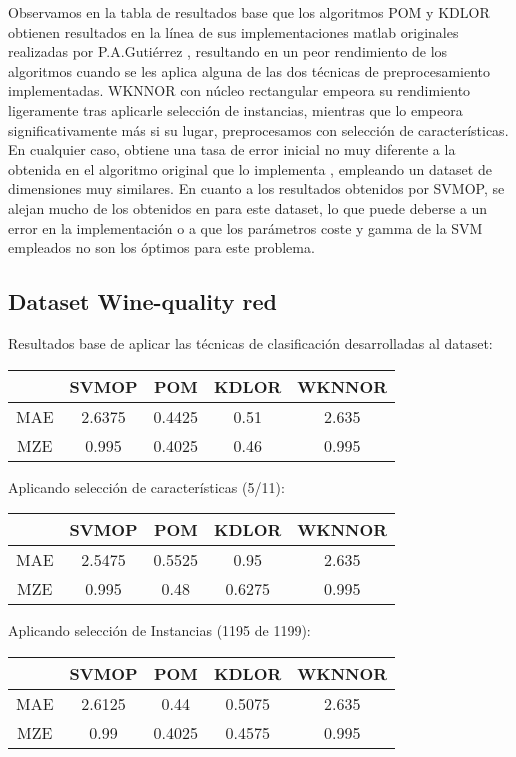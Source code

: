 Observamos en la tabla de resultados base que los algoritmos POM y KDLOR obtienen resultados en la línea de sus implementaciones matlab originales realizadas por P.A.Gutiérrez \cite{Gutiérrez2016}, resultando en un peor rendimiento de los algoritmos cuando se les aplica alguna de las dos técnicas de preprocesamiento implementadas.  WKNNOR con núcleo rectangular empeora su rendimiento ligeramente tras aplicarle selección de instancias, mientras que lo empeora significativamente más si su lugar, preprocesamos con selección de características. En cualquier caso, obtiene una tasa de error inicial no muy diferente a la obtenida en el algoritmo original que lo implementa \cite{duivesteijn2008nearest}, empleando un dataset de dimensiones muy similares. En cuanto a los resultados obtenidos por SVMOP, se alejan mucho de los obtenidos en \cite{Gutiérrez2016} para este dataset, lo que puede deberse a un error en la implementación o a que los parámetros coste y gamma de la SVM empleados no son los óptimos para este problema.

\subsection{Dataset Wine-quality red}
Resultados base de aplicar las técnicas de clasificación desarrolladas al dataset:
\begin{center}
\begin{tabular}{ c c c c c }
	& SVMOP & POM & KDLOR & WKNNOR\\
	\hline	
	MAE &	2.6375 & 0.4425 & 0.51  & 2.635 \\
	MZE &	0.995 & 0.4025 & 0.46  & 0.995  \\
	\hline  
\end{tabular}
\end{center}
\vspace{20pt}
Aplicando selección de características (5/11):
\begin{center}
\begin{tabular}{ c c c c c }
	& SVMOP & POM & KDLOR & WKNNOR \\
	\hline	
	MAE &	2.5475 & 0.5525 & 0.95  & 2.635 \\
	MZE &	0.995 & 0.48 & 0.6275 & 0.995  \\
	\hline  
\end{tabular}
\end{center}
\vspace{20pt}
Aplicando selección de Instancias (1195 de 1199):\\
\begin{center}
\begin{tabular}{ c c c c c }
	& SVMOP & POM & KDLOR & WKNNOR \\
	\hline	
	MAE &	2.6125 & 0.44 & 0.5075  & 2.635 \\
	MZE &	0.99 & 0.4025 & 0.4575 & 0.995  \\
	\hline  
\end{tabular}
\end{center}

